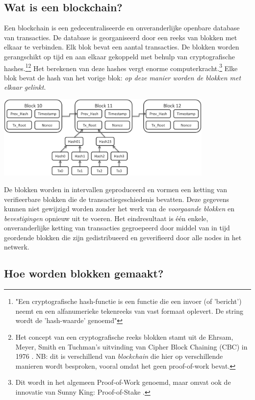 \documentclass[11pt]{article}
\begin{document}
\subsection{Wat is een blockchain?}

Een blockchain is een gedecentraliseerde en onveranderlijke openbare database van transacties. De database is georganiseerd door een reeks van blokken met elkaar te verbinden. Elk blok bevat een aantal transacties.
De blokken worden gerangschikt op tijd en aan elkaar gekoppeld met behulp van cryptografische hashes.\footnote{"Een cryptografische hash-functie is een functie die een invoer (of 'bericht') neemt en een alfanumerieke tekenreeks van vast formaat oplevert. De string wordt de 'hash-waarde' genoemd"\cite{wikihash}}\footnote{Het concept van een cryptografische reeks blokken stamt uit de Ehrsam, Meyer, Smith en Tuchman's uitvinding van Cipher Block Chaining (CBC) in 1976 \cite{cbc}. NB: dit is verschillend van \textit{blockchain} die hier op verschillende manieren wordt besproken, vooral omdat het geen proof-of-work bevat.}
Het berekenen van deze hashes vergt enorme computerkracht.\footnote{Dit wordt in het algemeen Proof-of-Work genoemd, maar omvat ook de innovatie van Sunny King: Proof-of-Stake \cite{peercoin}.} Elke blok bevat de hash van het vorige blok: \textit{op deze manier worden de blokken met elkaar gelinkt}.

\begin{center}
\includegraphics[width=0.80\textwidth]{./blockchain.png}
\end{center}
De blokken worden in intervallen geproduceerd en vormen een ketting van verifieerbare blokken die de transactiegeschiedenis bevatten. Deze gegevens kunnen niet gewijzigd worden zonder het werk van de \textit{voorgaande blokken} en \textit{bevestigingen} opnieuw uit te voeren.
Het eindresultaat is \'e\'en enkele, onveranderlijke ketting van transacties gegroepeerd door middel van in tijd geordende blokken die zijn gedistribueerd en geverifieerd door alle nodes in het netwerk.

\subsection{Hoe worden blokken gemaakt?}
\end{document}
